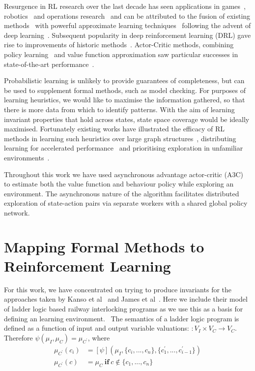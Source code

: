 \documentclass[runningheads]{llncs}
\begin{document}
Resurgence in RL research over the last decade has seen applications in games~\cite{schaul2015prioritized, silver2016mastering, vinyals2019grandmaster}, robotics~\cite{gu2017deep, bloesch2022towards} and operations research~\cite{mazyavkina2021reinforcement} and can be attributed to the fusion of existing methods~\cite{watkins1992q} with powerful approximate learning techniques~\cite{lecun2015deep} following the advent of deep learning~\cite{mnih2013playing}. Subsequent popularity in deep reinforcement learning (DRL) gave rise to improvements of historic methods~\cite{schulman2017trust}. Actor-Critic methods, combining policy learning~\cite{kakade2001natural} and value function approximation saw particular successes in state-of-the-art performance~\cite{schulman2017proximal}.

Probabilistic learning is unlikely to provide guarantees of completeness, but can be used to supplement formal methods, such as model checking. For purposes of learning heuristics, we would like to maximise the information gathered, so that there is more data from which to identify patterns. With the aim of learning invariant properties that hold across states, state space coverage would be ideally maximised. Fortunately existing works have illustrated the efficacy of RL methods in learning such heuristics over large graph structures~\cite{manchanda2019learning}, distributing learning for accelerated performance~\cite{hoffman2020acme} and prioritising exploration in unfamiliar environments~\cite{ostrovski2017countbased, haarnoja2018soft, gordillo2021improving}.

Throughout this work we have used asynchronous advantage actor-critic (A3C) to estimate both the value function and behaviour policy while exploring an environment. The asynchronous nature of the algorithm facilitates distributed exploration of state-action pairs via separate workers with a shared global policy network.


\section{Mapping Formal Methods to Reinforcement Learning} \label{sec:mapping_fm_to_ml}
For this work, we have concentrated on trying to produce invariants for the approaches taken by Kanso et al~\cite{kanso2009automated} and James et al~\cite{james2013verification}. Here we include their model of ladder logic based railway interlocking programs as we use this as a basis for defining an  learning environment.
\
The semantics of a ladder logic program is defined as a function of input and output variable valuations:
\begin{math}
	[\psi] : V_I \times V_C \to V_C
\end{math}. Therefore $\psi(\mu_I, \mu_C) = \mu_{C^\prime}$, where
\begin{align}
	\mu_{C^\prime}(c_i) & = [\psi](\mu_I, \{c_i,...,c_n\}, \{c^\prime_1,...,c^\prime_{i-1}\}) \\
	\mu_{C^\prime}(c) & = \mu_C \ \mathbf{if} \ c \notin \{c_1,...,c_n\} 
\end{align} 
\end{document}

